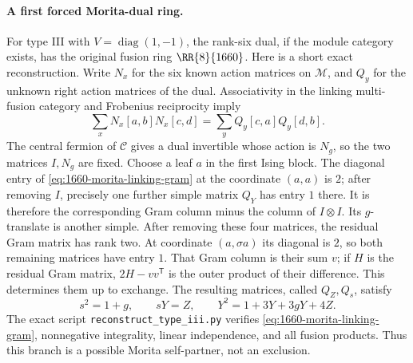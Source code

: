 \paragraph{A first forced Morita-dual ring.}
For type III with $V=\operatorname{diag}(1,-1)$, the rank-six dual,
if the module category exists, has the original fusion ring
$\RR{8}{1660}$. Here is a short exact reconstruction.
Write $N_x$ for the six known action matrices on $\mathcal M$, and $Q_y$ for
the unknown right action matrices of the dual. Associativity in the
linking multi-fusion category and Frobenius reciprocity imply
\begin{equation}
\sum_x N_x[a,b]N_x[c,d]
 =\sum_y Q_y[c,a]Q_y[d,b]. \label{eq:1660-morita-linking-gram}
\end{equation}
The central fermion of $\mathcal C$ gives a dual invertible whose action is
$N_g$, so the two matrices $I,N_g$ are fixed. Choose a leaf $a$ in the
first Ising block. The diagonal entry of \eqref{eq:1660-morita-linking-gram} at the coordinate $(a,a)$
is $2$; after removing $I$, precisely one further simple matrix $Q_Y$
has entry $1$ there. It is therefore the corresponding Gram column
minus the column of $I\otimes I$. Its $g$-translate is another simple.
After removing these four matrices, the residual Gram matrix has rank
two. At coordinate $(a,\sigma a)$ its diagonal is $2$, so both remaining
matrices have entry $1$. That Gram column is their sum $v$; if $H$ is
the residual Gram matrix, $2H-vv^{\mathsf T}$ is the outer product of
their difference. This determines them up to exchange.
The resulting matrices, called $Q_Z,Q_s$, satisfy
\[
s^2=1+g,\qquad sY=Z,\qquad
Y^2=1+3Y+3gY+4Z.
\]
The exact script \texttt{reconstruct\_type\_iii.py} verifies \eqref{eq:1660-morita-linking-gram},
nonnegative integrality, linear independence, and all fusion products.
Thus this branch is a possible Morita self-partner, not an exclusion.

